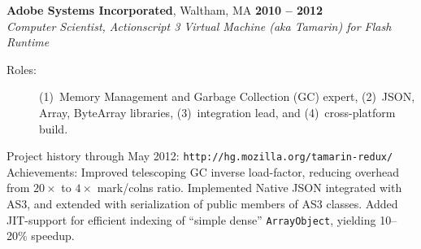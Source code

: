 \documentclass[margin,line,draft]{res}
\def\noneed#1{}
\begin{document}
\begin{resume}
    \textbf{Adobe Systems Incorporated}, Waltham, MA \hfill \textbf{2010 -- 2012}\\\vspace{1mm}%
    \textsl{Computer Scientist, Actionscript 3 Virtual Machine (aka Tamarin) for Flash Runtime}
\begin{description}
\item[\rm Roles:] (1)~Memory Management and Garbage Collection (GC) expert,
  (2)~JSON, Array, ByteArray libraries,
  (3)~integration lead,
  and
  (4)~cross-platform build.
\end{description}
    \vspace{-2mm}
    Project history through May 2012: {\tt http://hg.mozilla.org/tamarin-redux/}\\
    Achievements: Improved telescoping GC inverse load-factor, reducing overhead from $20\times$ to $4\times$ mark/colns ratio. Implemented Native JSON integrated with AS3, and extended with serialization of public members of AS3 classes. Added JIT-support for efficient indexing of ``simple dense'' {\tt ArrayObject}, yielding 10--20\% speedup.
% 
% 
% 
% 

\end{resume}
\end{document}
